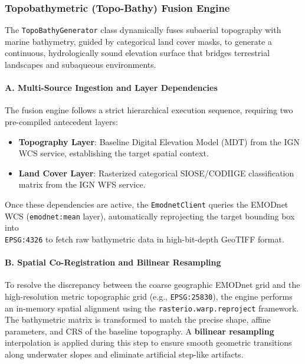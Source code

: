 \subsubsection{Topobathymetric (Topo-Bathy) Fusion Engine}

The \texttt{TopoBathyGenerator} class dynamically fuses subaerial topography with marine bathymetry, guided by categorical land cover masks, to generate a continuous, hydrologically sound elevation surface that bridges terrestrial landscapes and subaqueous environments.

\paragraph{A. Multi-Source Ingestion and Layer Dependencies}

The fusion engine follows a strict hierarchical execution sequence, requiring two pre-compiled antecedent layers:
\begin{itemize}
    \item \textbf{Topography Layer}: Baseline Digital Elevation Model (MDT) from the IGN WCS service, establishing the target spatial context.
    \item \textbf{Land Cover Layer}: Rasterized categorical SIOSE/CODIIGE classification matrix from the IGN WFS service.
\end{itemize}
Once these dependencies are active, the \texttt{EmodnetClient} queries the EMODnet WCS (\texttt{emodnet:mean} layer), automatically reprojecting the target bounding box into \\ \texttt{EPSG:4326} to fetch raw bathymetric data in high-bit-depth GeoTIFF format.

\paragraph{B. Spatial Co-Registration and Bilinear Resampling}

To resolve the discrepancy between the coarse geographic EMODnet grid and the high-resolution metric topographic grid (e.g., \texttt{EPSG:25830}), the engine performs an in-memory spatial alignment using the \texttt{rasterio.warp.reproject} framework. The bathymetric matrix is transformed to match the precise shape, affine parameters, and CRS of the baseline topography. A \textbf{bilinear resampling} interpolation is applied during this step to ensure smooth geometric transitions along underwater slopes and eliminate artificial step-like artifacts.

